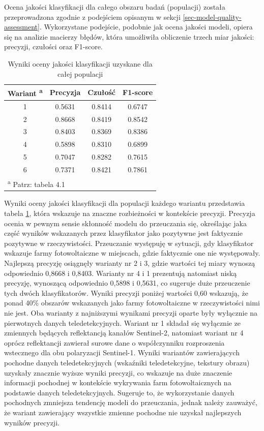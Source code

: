 \documentclass{amuthesis}
\begin{document}
Ocena jakości klasyfikacji dla całego obszaru badań (populacji) została
przeprowadzona zgodnie z podejściem opisanym w sekcji
\ref{sec-model-quality-assessment}. Wykorzystane podejście, podobnie jak
ocena jakości modeli, opiera się na analizie macierzy błędów, która
umożliwiła obliczenie trzech miar jakości: precyzji, czułości oraz
F1-score.

\hypertarget{tbl-tabela-population-quality-assessment}{}
\begin{table}
\caption{\label{tbl-tabela-population-quality-assessment}Wyniki oceny jakości klasyfikacji uzyskane dla całej populacji }\tabularnewline

\centering
\begin{tabular}{cccc}
\toprule
Wariant \textsuperscript{a} & Precyzja & Czułość & F1-score\\
\midrule
1 & 0.5631 & 0.8414 & 0.6747\\
2 & 0.8668 & 0.8419 & 0.8542\\
3 & 0.8403 & 0.8369 & 0.8386\\
4 & 0.5898 & 0.8310 & 0.6899\\
5 & 0.7047 & 0.8282 & 0.7615\\
6 & 0.7371 & 0.8421 & 0.7861\\
\bottomrule
\multicolumn{4}{l}{\textsuperscript{a} Patrz: tabela 4.1}\\
\end{tabular}
\end{table}

Wyniki oceny jakości klasyfikacji dla populacji każdego wariantu
przedstawia tabela \ref{tbl-tabela-population-quality-assessment}, która
wskazuje na znaczne rozbieżności w kontekście precyzji. Precyzja ocenia
w pewnym sensie skłonność modelu do przeuczania się, określając jaka
część wyników wskazanych przez klasyfikator jako pozytywne jest
faktycznie pozytywne w rzeczywistości. Przeuczanie występuję w sytuacji,
gdy klasyfikator wskazuje farmy fotowoltaiczne w miejscach, gdzie
faktycznie one nie występowały. Najlepszą precyzję osiągnęły warianty nr
2 i 3, gdzie wartości tej miary wynoszą odpowiednio 0,8668 i 0,8403.
Warianty nr 4 i 1 prezentują natomiast niską precyzję, wynoszącą
odpowiednio 0,5898 i 0,5631, co sugeruje duże przeuczenie tych dwóch
klasyfikatorów. Wyniki precyzji poniżej wartości 0,60 wskazują, że ponad
40\% obszarów wskazanych jako farmy fotowoltaiczne w rzeczywistości nimi
nie jest. Oba warianty z najniższymi wynikami precyzji oparte były
wyłącznie na pierwotnych danych teledetekcyjnych. Wariant nr 1 składał
się wyłącznie ze zmiennych będących reflektancją kanałów Sentinel-2,
natomiast wariant nr 4 oprócz reflektancji zawierał surowe dane o
współczynniku rozproszenia wstecznego dla obu polaryzacji Sentinel-1.
Wyniki wariantów zawierających pochodne danych teledetekcyjnych
(wskaźniki teledetekcyjne, tekstury obrazu) uzyskały znacznie wyższe
wyniki precyzji, co wskazuje na duże znaczenie informacji pochodnej w
kontekście wykrywania farm fotowoltaicznych na podstawie danych
teledetekcyjnych. Sugeruje to, że wykorzystanie danych pochodnych
zmniejsza tendencję modeli do przeuczania, jednak należy zauważyć, że
wariant zawierający wszystkie zmienne pochodne nie uzyskał najlepszych
wyników precyzji.
\end{document}
